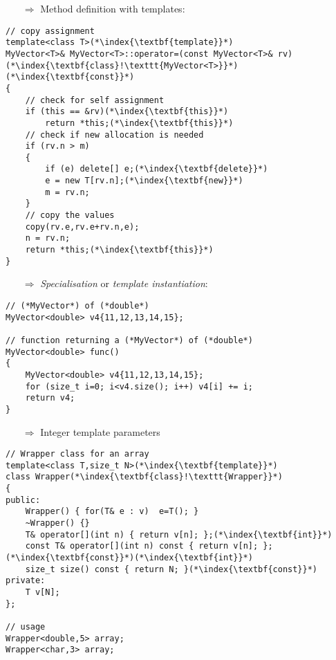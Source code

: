 \documentclass[10pt]{article}
\begin{document}
\begin{enumerate}
\item[$\Rightarrow$] Method definition with templates:
\end{enumerate}
\begin{lstlisting}
// copy assignment
template<class T>(*\index{\textbf{template}}*)
MyVector<T>& MyVector<T>::operator=(const MyVector<T>& rv)(*\index{\textbf{class}!\texttt{MyVector<T>}}*)(*\index{\textbf{const}}*)
{
    // check for self assignment
    if (this == &rv)(*\index{\textbf{this}}*)
        return *this;(*\index{\textbf{this}}*)
    // check if new allocation is needed
    if (rv.n > m)
    {
        if (e) delete[] e;(*\index{\textbf{delete}}*)
        e = new T[rv.n];(*\index{\textbf{new}}*)
        m = rv.n;
    }
    // copy the values
    copy(rv.e,rv.e+rv.n,e);
    n = rv.n;
    return *this;(*\index{\textbf{this}}*)
}
\end{lstlisting}
\begin{enumerate}
\item[$\Rightarrow$] \emph{Specialisation} or \emph{template instantiation}:
\end{enumerate}
\begin{lstlisting}
// (*MyVector*) of (*double*)
MyVector<double> v4{11,12,13,14,15};

// function returning a (*MyVector*) of (*double*)
MyVector<double> func()
{
    MyVector<double> v4{11,12,13,14,15};
    for (size_t i=0; i<v4.size(); i++) v4[i] += i;
    return v4;
}
\end{lstlisting}
\begin{enumerate}
\item[$\Rightarrow$] Integer template parameters
\end{enumerate}
\begin{lstlisting}
// Wrapper class for an array 
template<class T,size_t N>(*\index{\textbf{template}}*)
class Wrapper(*\index{\textbf{class}!\texttt{Wrapper}}*)
{
public:
    Wrapper() { for(T& e : v)  e=T(); }
    ~Wrapper() {}
    T& operator[](int n) { return v[n]; };(*\index{\textbf{int}}*)
    const T& operator[](int n) const { return v[n]; };(*\index{\textbf{const}}*)(*\index{\textbf{int}}*)
    size_t size() const { return N; }(*\index{\textbf{const}}*)
private:
    T v[N];
};

// usage
Wrapper<double,5> array;
Wrapper<char,3> array;
\end{lstlisting}
\end{document}
